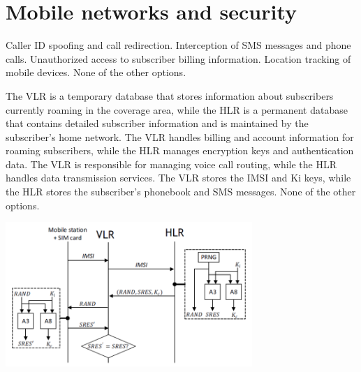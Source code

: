 \section{Mobile networks and security}



\begin{checkboxes}
    \CorrectChoice Caller ID spoofing and call redirection.
    \CorrectChoice Interception of SMS messages and phone calls.
    \choice Unauthorized access to subscriber billing information.
    \choice Location tracking of mobile devices.
    \choice None of the other options.
\end{checkboxes}


\begin{checkboxes}
    \CorrectChoice The VLR is a temporary database that stores information about subscribers currently roaming in the coverage area, while the HLR is a permanent database that contains detailed subscriber information and is maintained by the subscriber's home network.
    \choice The VLR handles billing and account information for roaming subscribers, while the HLR manages encryption keys and authentication data.
    \choice The VLR is responsible for managing voice call routing, while the HLR handles data transmission services.
    \choice The VLR stores the IMSI and Ki keys, while the HLR stores the subscriber's phonebook and SMS messages.
    \choice None of the other options.
\end{checkboxes}


\begin{solution}
    \center
    \includegraphics[width=0.7\textwidth]{images/GSM_auth.png}
\end{solution}


